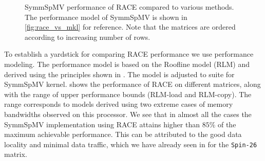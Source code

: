 \begin{figure}[tb]
	\caption{\label{fig:symm_spmv_perf} \acrshort{SymmSpMV} performance of \acrshort{RACE} compared to 
		various methods. The performance model of \acrshort{SymmSpMV} is shown in 
		\cref{fig:race_vs_mkl} for reference. Note that the matrices are ordered according 
		to increasing number of rows.}
\end{figure}
To establish a yardstick for comparing \acrshort{RACE} performance we use 
performance modeling. The performance model is based on the Roofline  model (RLM)
 \cite{Williams_roofline}  and derived using the principles shown 
 in \cite{Moritz_sell}. The model is adjusted to suite for \acrshort{SymmSpMV}
kernel.  shows the performance of \acrshort{RACE}
on different matrices, along with the range of upper performance bounds 
(RLM-load and RLM-copy). The range corresponds to models derived using two
extreme cases of memory bandwidths observed on this processor. 
We see that in almost all the cases the \acrshort{SymmSpMV} implementation
using \acrshort{RACE} attains higher than $85\%$ of the maximum achievable performance.
This can be attributed to the good data
locality and minimal data traffic, which we have already seen in
  for the \texttt{Spin-26} matrix. 
 
